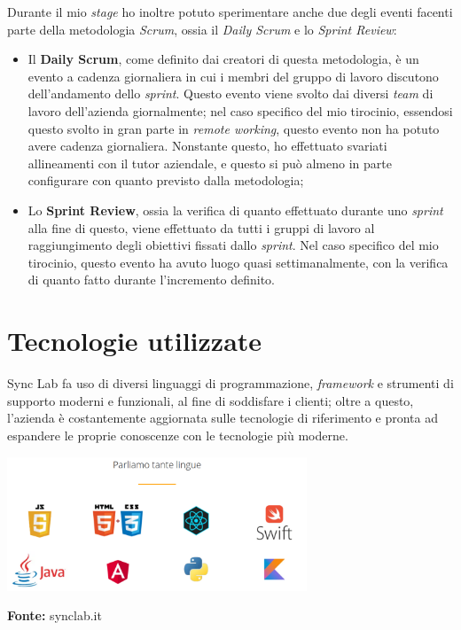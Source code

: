 Durante il mio \textit{stage} ho inoltre potuto sperimentare anche due degli eventi facenti parte della metodologia \textit{Scrum}, ossia il \textit{Daily Scrum} e lo \textit{Sprint Review}:
\begin{itemize}
  \item Il \textbf{Daily Scrum}, come definito dai creatori di questa metodologia, è un evento a cadenza giornaliera in cui i membri del gruppo di lavoro discutono dell'andamento dello \textit{sprint}. Questo evento viene svolto dai diversi \textit{team} di lavoro dell'azienda giornalmente; nel caso specifico del mio tirocinio, essendosi questo svolto in gran parte in \textit{remote working}, questo evento non ha potuto avere cadenza giornaliera. Nonstante questo, ho effettuato svariati allineamenti con il tutor aziendale, e questo si può almeno in parte configurare con quanto previsto dalla metodologia;
  \item Lo \textbf{Sprint Review}, ossia la verifica di quanto effettuato durante uno \textit{sprint} alla fine di questo, viene effettuato da tutti i gruppi di lavoro al raggiungimento degli obiettivi fissati dallo \textit{sprint}. Nel caso specifico del mio tirocinio, questo evento ha avuto luogo quasi settimanalmente, con la verifica di quanto fatto durante l'incremento definito.
\end{itemize}


\section{Tecnologie utilizzate}

Sync Lab fa uso di diversi linguaggi di programmazione, \textit{framework} e strumenti di supporto moderni e funzionali, al fine di soddisfare i clienti; oltre a questo, l'azienda è costantemente aggiornata sulle tecnologie di riferimento e pronta ad espandere le proprie conoscenze con le tecnologie più moderne. \\

\begin{minipage}{\linewidth}
  \centering
    \includegraphics[height=4cm]{immagini/linguaggi}
  \caption*{\textbf{Fonte:} synclab.it}
\end{minipage} \\

